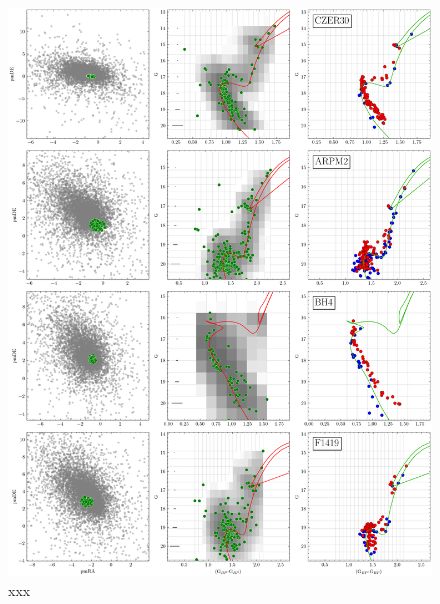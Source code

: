 \documentclass[referee]{aa}
\begin{document}
\begin{appendix}
 \begin{figure}
  \centering
  \includegraphics[height=.95\textheight]{figs/8_fpars.png}
  \caption{xxx}
  \label{fig:12fpars}
 \end{figure}


\end{appendix}
\end{document}

